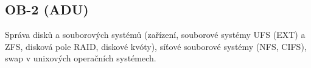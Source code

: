 \subsection{OB-2 (ADU)}
Správa disků a souborových systémů (zařízení, souborové systémy UFS (EXT) a ZFS, disková pole RAID, diskové kvóty), síťové souborové systémy (NFS, CIFS), swap v unixových operačních systémech.
